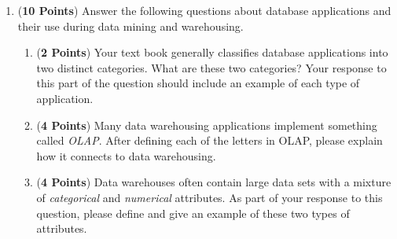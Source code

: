 \documentclass[12pt]{article}
\begin{document}
\begin{enumerate}




\newpage

\item ({\bf 10 Points}) Answer the following questions about database
  applications and their use during data mining and warehousing.

  \begin{enumerate}

  \item ({\bf 2 Points}) Your text book generally classifies database
    applications into two distinct categories.  What are these two
    categories?  Your response to this part of the question should
    include an example of each type of application.


  \item ({\bf 4 Points}) Many data warehousing applications implement
    something called {\em OLAP}.  After defining each of the letters
    in OLAP, please explain how it connects to data warehousing.

  \item ({\bf 4 Points}) Data warehouses often contain large data sets
    with a mixture of {\em categorical} and {\em numerical}
    attributes.  As part of your response to this question, please
    define and give an example of these two types of attributes.


\end{enumerate}
\end{enumerate}
\end{document}
